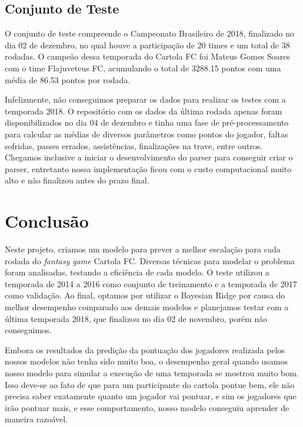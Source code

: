 \documentclass[conference]{IEEEtran}
\newcommand{\tit}[1]{{\textit{#1}}}
\begin{document}
\pagebreak

\subsection{Conjunto de Teste}

O  conjunto  de teste  compreende  o  Campeonato Brasileiro  de  2018,
finalizado no dia 02 de dezembro, no qual houve a participação de 20
times e um total de 38  rodadas. O campeão dessa temporada do Cartola
FC foi  Mateus Gomes Soares  com o  time Flajuveteus FC,  acumulando o
total de 3288.15 pontos com uma média de 86.53 pontos por rodada.

Infelizmente,  não conseguimos  preparar  os dados  para realizar  os
testes com a temporada 2018.  O repositório \cite{git_cartola} com os
dados da  última rodada  apenas foram disponibilizados  no dia  04 de
dezembro  e tinha  uma  fase de  pré-processamento  para calcular  as
médias  de  diversos  parâmetros  como  pontos  do  jogador,  faltas
sofridas,  passes  errados,  assistências, finalizações  na  trave,
entre outros. Chegamos inclusive a iniciar o desenvolvimento do parser
para conseguir criar o  parser, entretanto nossa implementação ficou
com o custo  computacional muito alto e não finalizou  antes do prazo
final.

\section{Conclusão}

Neste projeto, criamos um modelo para prever a melhor escalação para
cada rodada do \tit{fantasy game}  Cartola FC. Diversas técnicas para
modelar o  problema foram analisadas,  testando a eficiência  de cada
modelo. O teste  utilizou a temporada de 2014 a  2016 como conjunto de
treinamento e a temporada de  2017 como validação. Ao final, optamos
por utilizar o Bayesian Ridge por causa do melhor desempenho comparado
aos demais modelos  e planejamos testar com a  última temporada 2018,
que finalizou no dia 02 de novembro, porém não conseguimos.

Embora  os  resultados  da  predição da  pontuação  dos  jogadores
realizada pelos nossos modelos não tenha sido muito boa, o desempenho
geral  quando usamos  nosso modelo  para simular  a execução  de uma
temporada se  mostrou muito bom. Isso  deve-se ao fato de  que para um
participante do cartola pontue bem,  ele não precisa saber exatamente
quanto um  jogador vai pontuar, e  sim os jogadores que  irão pontuar
mais, e esse comportamento, nosso modelo conseguiu aprender de maneira
razoável.
\end{document}
